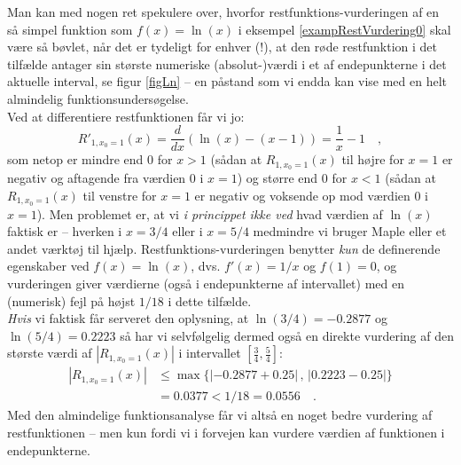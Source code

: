 \begin{think}
Man kan med nogen ret spekulere over, hvorfor restfunktions-vurderingen  af en så simpel funktion som $f(x) = \ln(x)$ i eksempel \ref{exampRestVurdering0} skal være så bøvlet, når det er tydeligt for enhver (!), at den røde restfunktion i det tilfælde antager sin største numeriske (absolut-)værdi i et af endepunkterne i det aktuelle interval, se figur \ref{figLn} -- en påstand som vi endda kan vise med en helt almindelig funktionsundersøgelse. \\

Ved at differentiere restfunktionen får vi jo:
\begin{equation}
R'_{1, x_{0}=1}(x) = \frac{d}{dx}\left(\ln(x) - (x-1) \right) = \frac{1}{x} - 1 \quad,
\end{equation}
som netop er mindre end $0$ for $x >1$ (sådan at $R_{1, x_{0}=1}(x) $ til højre for $x=1$ er negativ og aftagende fra værdien $0$ i $x=1$) og større end $0$ for $x <1$
 (sådan at $R_{1, x_{0}=1}(x) $ til venstre for $x=1$ er negativ og voksende op mod værdien $0$ i $x=1$). Men problemet er, at vi {\emph{i princippet ikke ved}}  hvad værdien af  $\ln(x)$ faktisk er -- hverken i $x=3/4$ eller i $x=5/4$ medmindre vi bruger Maple eller et andet værktøj til hjælp. Restfunktions-vurderingen benytter {\emph{kun}} de definerende egen\-ska\-ber ved $f(x) = \ln(x)$, dvs. $f'(x) = 1/x$ og $f(1)=0$, og vurderingen giver værdierne (også i endepunkterne af intervallet) med en (numerisk) fejl på højst $1/18$ i dette tilfælde. \\

 {\emph{Hvis}} vi faktisk får serveret  den oplysning, at
 $\ln(3/4) = -0.2877$ og  $\ln(5/4) = 0.2223$ så har vi selvfølgelig dermed også en direkte vurdering af den største værdi af $|R_{1, x_{0}=1}(x)|$ i intervallet $\left[\frac{3}{4}, \frac{5}{4} \right]$:
 \begin{equation}
 \begin{aligned}
 |R_{1, x_{0}=1}(x)| &\leq \max\{|-0.2877 + 0.25| \, , \, |0.2223 - 0.25| \} \\
  &= 0.0377 < 1/18 = 0.0556 \quad.
 \end{aligned}
 \end{equation}
 Med den almindelige funktionsanalyse får vi altså en noget bedre vurdering af restfunktionen -- men kun fordi vi i forvejen kan vurdere værdien af funktionen  i endepunkterne.


\end{think}

